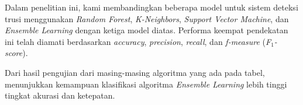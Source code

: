 \documentclass[conference]{IEEEtran}
\begin{document}
Dalam penelitian ini, kami membandingkan beberapa model untuk sistem deteksi trusi menggunakan \emph{Random Forest}, \emph{K-Neighbors}, \emph{Support Vector Machine}, dan \emph{Ensemble  Learning} dengan ketiga model diatas. Performa keempat pendekatan ini telah diamati berdasarkan \emph{accuracy}, \emph{precision}, \emph{recall}, dan \emph{f-measure} (\emph{F$_1$-score}).

Dari hasil pengujian dari masing-masing algoritma yang ada pada tabel, menunjukkan kemampuan klasifikasi algoritma \emph{Ensemble  Learning} lebih tinggi tingkat akurasi dan ketepatan.  




\vspace{12pt}
\end{document}
